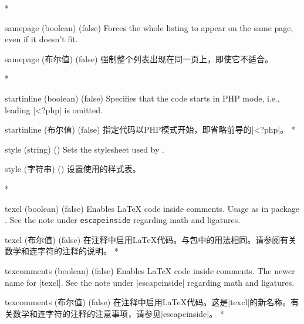 \begin{optionlist}
\begin{paracol}{2}
\switchcolumn[0]*%
  \item[samepage (boolean) (false)]
    Forces the whole listing to appear on the same page, even if it doesn't fit.
    \switchcolumn
    \item[samepage (布尔值) (false)]
    强制整个列表出现在同一页上，即使它不适合。

\switchcolumn[0]*%

  \item[startinline (boolean) (false)] 
    Specifies that the code starts in PHP mode, i.e., leading |<?php| is omitted.
    \switchcolumn
    \item[startinline (布尔值) (false)] 
    指定代码以PHP模式开始，即省略前导的|<?php|。
\switchcolumn[0]*%
  \item[style] (string) ()
    Sets the stylesheet used by .
    \switchcolumn
    \item[style] (字符串) ()
    设置使用的样式表。





\switchcolumn[0]*%
  \item[texcl (boolean) (false)]
    Enables \LaTeX{} code inside comments.
    Usage as in package .  See the note under \texttt{escapeinside} regarding math and ligatures.
    \switchcolumn
    \item[texcl (布尔值) (false)]
    在注释中启用\LaTeX{}代码。与包中的用法相同。请参阅有关数学和连字符的注释的说明。
\switchcolumn[0]*%
  \item[texcomments (boolean) (false)]
    Enables \LaTeX{} code inside comments.  The newer name for |texcl|.  See the note under |escapeinside| regarding math and ligatures.
    \switchcolumn
    \item[texcomments (布尔值) (false)]
    在注释中启用\LaTeX{}代码。这是|texcl|的新名称。有关数学和连字符的注释的注意事项，请参见|escapeinside|。
\switchcolumn[0]*%


\end{paracol}
\end{optionlist}
